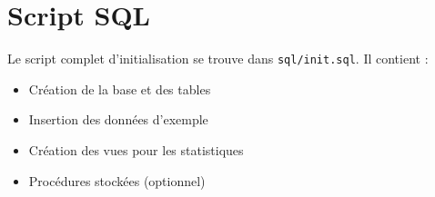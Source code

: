 \documentclass[12pt,a4paper]{report}
\begin{document}
\chapter{Script SQL}
Le script complet d'initialisation se trouve dans \texttt{sql/init.sql}. Il contient :
\begin{itemize}
    \item Création de la base et des tables
    \item Insertion des données d'exemple
    \item Création des vues pour les statistiques
    \item Procédures stockées (optionnel)
\end{itemize}
\end{document}
